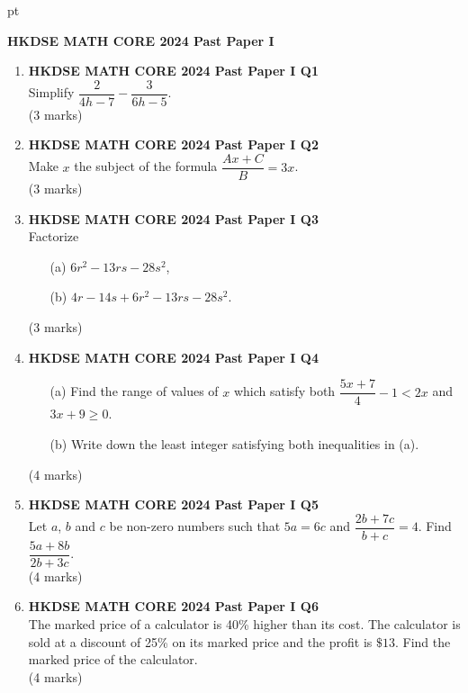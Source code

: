 \documentclass[12pt]{article}
\begin{document}
 pt
\begin{center}
	{\large \bf HKDSE MATH CORE 2024 Past Paper I}\\
	\vspace{2 mm}

\end{center}
\vspace{0.05cm}

\begin{enumerate}
	\item \textbf{HKDSE MATH CORE 2024 Past Paper I Q1}\\
	Simplify $\dfrac{2}{4h - 7} - \dfrac{3}{6h - 5}$. \\(3 marks)

	\item \textbf{HKDSE MATH CORE 2024 Past Paper I Q2}\\
	Make $x$ the subject of the formula $\dfrac{Ax + C}{B} = 3x$. \\(3 marks)	

	\item \textbf{HKDSE MATH CORE 2024 Past Paper I Q3}\\
	Factorize
	\begin{enumerate}
		\item[(a)] $6r^2 - 13rs - 28s^2$,
		\item[(b)] $4r - 14s + 6r^2 - 13rs - 28s^2$.
	\end{enumerate}
	(3 marks)

	\item \textbf{HKDSE MATH CORE 2024 Past Paper I Q4}\\
	\begin{enumerate}
		\item[(a)] Find the range of values of $x$ which satisfy both $\dfrac{5x + 7}{4} - 1 < 2x$ and $3x + 9 \geq 0$.
		\item[(b)] Write down the least integer satisfying both inequalities in (a).
	\end{enumerate}
	(4 marks)

	\item \textbf{HKDSE MATH CORE 2024 Past Paper I Q5}\\
	Let $a$, $b$ and $c$ be non-zero numbers such that $5a = 6c$ and $\dfrac{2b + 7c}{b + c} = 4$. Find $\dfrac{5a + 8b}{2b + 3c}$. \\(4 marks)


	\item \textbf{HKDSE MATH CORE 2024 Past Paper I Q6}\\
    The marked price of a calculator is 40\% higher than its cost. The calculator is sold at a discount of 25\% on its marked price and the profit is $\$13$. 
    Find the marked price of the calculator. \\(4 marks)


\end{enumerate}
\end{document}
